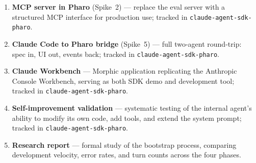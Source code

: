 \documentclass[a4paper,10pt,fleqn]{article}
\begin{document}
\begin{enumerate}
  \item \textbf{MCP server in Pharo} (Spike~2) --- replace the eval
    server with a structured MCP interface for production use; tracked
    in \texttt{claude-agent-sdk-pharo}.
  \item \textbf{Claude Code to Pharo bridge} (Spike~5) --- full
    two-agent round-trip: spec in, UI out, events back; tracked in
    \texttt{claude-agent-sdk-pharo}.
  \item \textbf{Claude Workbench} --- Morphic application replicating
    the Anthropic Console Workbench, serving as both SDK demo and
    development tool; tracked in \texttt{claude-agent-sdk-pharo}.
  \item \textbf{Self-improvement validation} --- systematic testing of
    the internal agent's ability to modify its own code, add tools, and
    extend the system prompt; tracked in
    \texttt{claude-agent-sdk-pharo}.
  \item \textbf{Research report} --- formal study of the bootstrap
    process, comparing development velocity, error rates, and turn
    counts across the four phases.
\end{enumerate}
\end{document}
